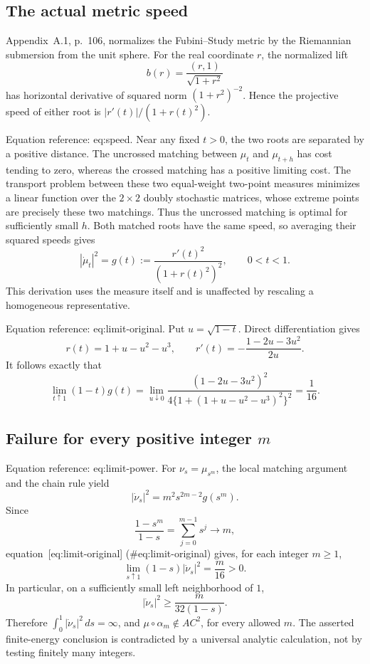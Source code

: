 \documentclass[10pt]{article}
\begin{document}
\subsection*{The actual metric speed}
Appendix A.1, p. 106, normalizes the Fubini–Study metric by the Riemannian submersion from the unit sphere. For the real coordinate \(r\), the normalized lift \[b(r)=\frac{(r,1)}{\sqrt{1+r^2}}\] has horizontal derivative of squared norm \((1+r^2)^{-2}\). Hence the projective speed of either root is \(|r'(t)|/(1+r(t)^2)\).\par
Equation reference: eq:speed. Near any fixed \(t>0\), the two roots are separated by a positive distance. The uncrossed matching between \(\mu_t\) and \(\mu_{t+h}\) has cost tending to zero, whereas the crossed matching has a positive limiting cost. The transport problem between these two equal-weight two-point measures minimizes a linear function over the \(2\times2\) doubly stochastic matrices, whose extreme points are precisely these two matchings. Thus the uncrossed matching is optimal for sufficiently small \(h\). Both matched roots have the same speed, so averaging their squared speeds gives \[
 |\dot\mu_t|^2=g(t):=\frac{r'(t)^2}{(1+r(t)^2)^2},\qquad 0<t<1.\] This derivation uses the measure itself and is unaffected by rescaling a homogeneous representative.\par
Equation reference: eq:limit-original. Put \(u=\sqrt{1-t}\). Direct differentiation gives \[r(t)=1+u-u^2-u^3,\qquad
 r'(t)=-\frac{1-2u-3u^2}{2u}.\] It follows exactly that \[
 \lim_{t\uparrow1}(1-t)g(t)
 =\lim_{u\downarrow0}
 \frac{(1-2u-3u^2)^2}
 {4\{1+(1+u-u^2-u^3)^2\}^{2}}
 =\frac1{16}.\]\par
\subsection*{Failure for every positive integer \(m\)}
Equation reference: eq:limit-power. For \(\nu_s=\mu_{s^m}\), the local matching argument and the chain rule yield \[|\dot\nu_s|^2=m^2s^{2m-2}g(s^m).\] Since \[\frac{1-s^m}{1-s}=\sum_{j=0}^{m-1}s^j\longrightarrow m,\] equation [eq:limit-original] (\#eq:limit-original) gives, for each integer \(m\geq1\), \[
 \lim_{s\uparrow1}(1-s)|\dot\nu_s|^2=\frac{m}{16}>0.\] In particular, on a sufficiently small left neighborhood of \(1\), \[|\dot\nu_s|^2\geq\frac{m}{32(1-s)}.\] Therefore \(\int_0^1|\dot\nu_s|^2\,ds=\infty\), and \(\mu\circ\alpha_m\notin AC^2\), for every allowed \(m\). The asserted finite-energy conclusion is contradicted by a universal analytic calculation, not by testing finitely many integers.\par
\end{document}
